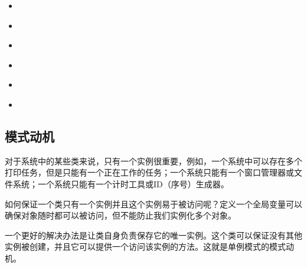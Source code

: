 \documentclass[letterpaper,10pt,english]{sphinxmanual}
\begin{document}
\begin{sphinxShadowBox}
\begin{itemize}
\begin{itemize}
\item {} 
\sphinxAtStartPar
{}\label{\detokenize{creational_patterns/singleton:id24}}{\hyperref[\detokenize{creational_patterns/singleton:id10}]{}}

\item {} 
\sphinxAtStartPar
{}\label{\detokenize{creational_patterns/singleton:id25}}{\hyperref[\detokenize{creational_patterns/singleton:id11}]{}}

\item {} 
\sphinxAtStartPar
{}\label{\detokenize{creational_patterns/singleton:id26}}{\hyperref[\detokenize{creational_patterns/singleton:id12}]{}}

\item {} 
\sphinxAtStartPar
{}\label{\detokenize{creational_patterns/singleton:id27}}{\hyperref[\detokenize{creational_patterns/singleton:id13}]{}}

\item {} 
\sphinxAtStartPar
{}\label{\detokenize{creational_patterns/singleton:id28}}{\hyperref[\detokenize{creational_patterns/singleton:id14}]{}}

\item {} 
\sphinxAtStartPar
{}\label{\detokenize{creational_patterns/singleton:id29}}{\hyperref[\detokenize{creational_patterns/singleton:id15}]{}}

\end{itemize}

\end{itemize}
\end{sphinxShadowBox}


\subsection{模式动机}
\label{\detokenize{creational_patterns/singleton:id3}}
\sphinxAtStartPar
对于系统中的某些类来说，只有一个实例很重要，例如，一个系统中可以存在多个打印任务，但是只能有一个正在工作的任务；一个系统只能有一个窗口管理器或文件系统；一个系统只能有一个计时工具或ID（序号）生成器。

\sphinxAtStartPar
如何保证一个类只有一个实例并且这个实例易于被访问呢？定义一个全局变量可以确保对象随时都可以被访问，但不能防止我们实例化多个对象。

\sphinxAtStartPar
一个更好的解决办法是让类自身负责保存它的唯一实例。这个类可以保证没有其他实例被创建，并且它可以提供一个访问该实例的方法。这就是单例模式的模式动机。
\end{document}
